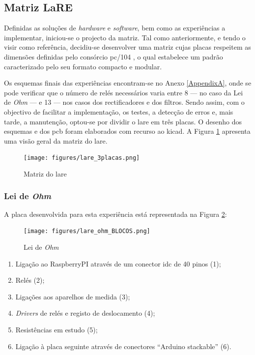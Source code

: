 \subsection{Matriz LaRE}
\label{sec:matriz}
Definidas as soluções de \textit{hardware} e \textit{software}, bem como as experiências a implementar, iniciou-se o projecto da matriz. Tal como anteriormente, e tendo o \acrshort{visir} como referência, decidiu-se desenvolver uma matriz cujas placas respeitem as dimensões definidas pelo consórcio \gls{pc/104} \cite{PC104}, o qual estabelece um padrão caracterizado pelo seu formato compacto e modular.

Os esquemas finais das experiências encontram-se no Anexo \ref{AppendixA}, onde se pode verificar que o número de relés necessários varia entre 8 — no caso da Lei de \textit{Ohm} — e 13 — nos casos dos rectificadores e dos filtros. Sendo assim, com o objectivo de facilitar a implementação, os testes, a detecção de erros e, mais tarde, a manutenção, optou-se por dividir o \acrshort{lare} em três placas. O desenho dos esquemas e dos \acrfull{pcb} foram elaborados com recurso ao \gls{kicad}. A Figura \ref{fig:matrizlare} apresenta uma visão geral da matriz do \acrshort{lare}. 

\begin{figure}[hbtp]
	\centering
	\texttt{[image: figures/lare\_3placas.png]}
	\caption{Matriz do \acrshort{lare}}
	\label{fig:matrizlare}
\end{figure}

\subsubsection{Lei de \textit{Ohm}}
A placa desenvolvida para esta experiência está representada na Figura \ref{fig:placaleideohm}:

\begin{figure}[hbtp]
	\centering
	\texttt{[image: figures/lare\_ohm\_BLOCOS.png]}
	\caption{ Lei de \textit{Ohm}}
	\label{fig:placaleideohm}
\end{figure}

\begin{enumerate}
	\item Ligação ao \gls{RaspberryPI} através de um conector \acrfull{idc} de 40 pinos (1);
	\item Relés (2);
	\item Ligações aos aparelhos de medida (3);
	\item \textit{Drivers} de relés e registo de deslocamento (4);
	\item Resistências em estudo (5);
	\item Ligação à placa seguinte através de conectores ``Arduino stackable'' (6).
\end{enumerate}

